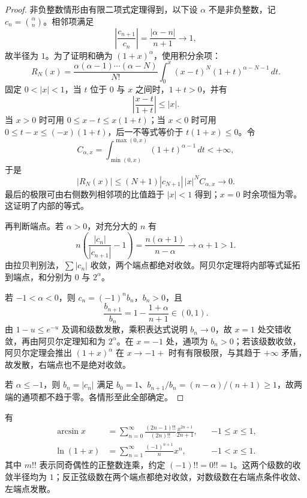 \documentclass[UTF8,12pt,a4paper,fontset=fandol]{ctexbook}
\begin{document}
\begin{proof}
非负整数情形由有限二项式定理得到，以下设 $\alpha$ 不是非负整数，记 $c_n=\binom\alpha n$。相邻项满足
\[
    \left|\frac{c_{n+1}}{c_n}\right|
       =\frac{|\alpha-n|}{n+1}\longrightarrow1,
\]
故半径为 $1$。为了证明和确为 $(1+x)^\alpha$，使用积分余项：
\[
    R_N(x)=\frac{\alpha(\alpha-1)\cdots(\alpha-N)}{N!}
       \int_0^x(x-t)^N(1+t)^{\alpha-N-1}\,dt.
\]
固定 $0<|x|<1$，当 $t$ 位于 $0$ 与 $x$ 之间时，$1+t>0$，并有
\[
    \left|\frac{x-t}{1+t}\right|\leq|x|.
\]
当 $x>0$ 时可用 $0\leq x-t\leq x(1+t)$；当 $x<0$ 时可用 $0\leq t-x\leq(-x)(1+t)$，后一不等式等价于 $t(1+x)\leq0$。令
\[
    C_{\alpha,x}=\int_{\min(0,x)}^{\max(0,x)}(1+t)^{\alpha-1}\,dt<+\infty,
\]
于是
\[
    |R_N(x)|\leq (N+1)|c_{N+1}|\,|x|^N C_{\alpha,x}
       \longrightarrow0.
\]
最后的极限可由右侧数列相邻项的比值趋于 $|x|<1$ 得到；$x=0$ 时余项恒为零。这证明了内部的等式。

再判断端点。若 $\alpha>0$，对充分大的 $n$ 有
\[
    n\left(\frac{|c_n|}{|c_{n+1}|}-1\right)
       =\frac{n(\alpha+1)}{n-\alpha}
       \longrightarrow\alpha+1>1.
\]
由拉贝判别法，$\sum|c_n|$ 收敛，两个端点都绝对收敛。阿贝尔定理将内部等式延拓到端点，和分别为 $0$ 与 $2^\alpha$。

若 $-1<\alpha<0$，则 $c_n=(-1)^nb_n$，$b_n>0$，且
\[
    \frac{b_{n+1}}{b_n}=1-\frac{1+\alpha}{n+1}\in(0,1).
\]
由 $1-u\leq e^{-u}$ 及调和级数发散，乘积表达式说明 $b_n\to0$，故 $x=1$ 处交错收敛，再由阿贝尔定理知和为 $2^\alpha$。在 $x=-1$ 处，通项为 $b_n>0$；若该级数收敛，阿贝尔定理会推出 $(1+x)^\alpha$ 在 $x\to-1+$ 时有有限极限，与其趋于 $+\infty$ 矛盾，故发散，右端点也不是绝对收敛。

若 $\alpha\leq-1$，则 $b_n=|c_n|$ 满足 $b_0=1$、$b_{n+1}/b_n=(n-\alpha)/(n+1)\geq1$，故两端的通项都不趋于零。各情形至此全部确定。
\end{proof}

\begin{proposition}[反正弦与对数的展开]
\label{prop:arcsine-and-logarithm-power-expansions}
有
\begin{align}
    \arcsin x
       &=\sum_{n=0}^\infty
         \frac{(2n-1)!!}{(2n)!!}\frac{x^{2n+1}}{2n+1},
       &&-1\leq x\leq1,
       \label{eq:arcsine-maclaurin-expansion}\\
    \ln(1+x)
       &=\sum_{n=1}^\infty\frac{(-1)^{n+1}}n x^n,
       &&-1<x\leq1.
       \label{eq:logarithm-maclaurin-expansion}
\end{align}
其中 $m!!$ 表示同奇偶性的正整数连乘，约定 $(-1)!!=0!!=1$。这两个级数的收敛半径均为 $1$；反正弦级数在两个端点都绝对收敛，对数级数在右端点条件收敛、左端点发散。
\end{proposition}
\end{document}
